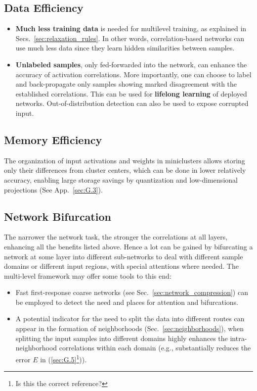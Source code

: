 \documentclass{article} %
\begin{document}
\subsection{Data Efficiency}
\label{sec:effective_data}
\begin{itemize}
	\item \textbf{Much less training data} is needed for multilevel training, as explained in Secs.~\ref{sec:relaxation_rules}. In other words, correlation-based networks can use much less data since they learn hidden similarities between samples.
	\item \textbf{Unlabeled samples}, only fed-forwarded into the network, can enhance the accuracy of activation correlations. More importantly, one can choose to label and back-propagate only samples showing marked disagreement with the established correlations. This can be used for \textbf{lifelong learning} of deployed networks. Out-of-distribution detection can also be used to expose corrupted input.
\end{itemize}

\subsection{Memory Efficiency}
\label{sec:memory_efficiency}
The organization of input activations and weights in miniclusters allows storing only their differences from cluster centers, which can be done in lower relatively accuracy, enabling large storage savings by quantization and low-dimensional projections (See App.~\ref{sec:G.3}).

\subsection{Network Bifurcation}
\label{sec:bifurcation}
The narrower the network task, the stronger the correlations at all layers, enhancing all the benefits listed above. Hence a lot can be gained by bifurcating a network at some layer into different sub-networks to deal with different sample domains or different input regions, with special attentions where needed. The multi-level framework may offer some tools to this end:
\begin{itemize}
	\item Fast first-response coarse networks (see Sec.~\ref{sec:network_compression}) can be employed to detect the need and places for attention and bifurcations.
	\item A potential indicator for the need to split the data into different routes can appear in the formation of neighborhoods (Sec.~\ref{sec:neighborhoods}), when splitting the input samples into different domains highly enhances the intra-neighborhood correlations within each domain (e.g., substantially reduces the error $E$ in (\ref{sec:G.5}\footnote{Is this the correct reference?})).
\end{itemize}
\end{document}
